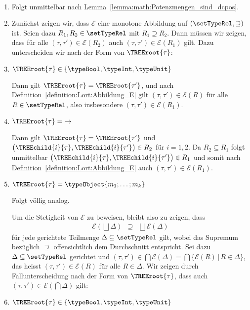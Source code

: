 \begin{beweis} \
  \begin{enumerate}
    \item Folgt unmittelbar nach Lemma~\ref{lemma:math:Potenzmengen_sind_dcpos}.

    \item Zun\"achst zeigen wir, dass $\mathcal{E}$ eine monotone Abbildung auf $(\setTypeRel,\supseteq)$ ist. Seien dazu
          $R_1,R_2\in\setTypeRel$ mit $R_1 \supseteq R_2$. Dann m\"ussen wir zeigen, dass f\"ur alle
          $(\tau,\tau')\in\mathcal{E}(R_2)$ auch $(\tau,\tau')\in\mathcal{E}(R_1)$ gilt. Dazu unterscheiden
          wir nach der Form von $\TREEroot{\tau}$:
          \PROOFCASEbeg
            \item $\TREEroot{\tau} \in \{\typeBool,\typeInt,\typeUnit\}$

                  Dann gilt $\TREEroot{\tau} = \TREEroot{\tau'}$, und nach Definition~\ref{definition:Lort:Abbildung_E}
                  gilt $(\tau,\tau')\in\mathcal{E}(R)$ f\"ur alle $R\in\setTypeRel$, also insbesondere
                  $(\tau,\tau')\in\mathcal{E}(R_1)$.
            
            \item $\TREEroot{\tau} =\ \to$

                  Dann gilt $\TREEroot{\tau} = \TREEroot{\tau'}$ und $\bigl(\TREEchild{i}{\tau},\TREEchild{i}{\tau'}\bigr)\in{R_2}$
                  f\"ur $i=1,2$. Da $R_2 \subseteq R_1$ folgt unmittelbar $\bigl(\TREEchild{i}{\tau},\TREEchild{i}{\tau'}\bigr)\in{R_1}$
                  und somit nach Definition~\ref{definition:Lort:Abbildung_E} auch $(\tau,\tau')\in\mathcal{E}(R_1)$.
            
            \item $\TREEroot{\tau} = \typeObject{m_1;\ldots;m_k}$

                  Folgt v\"ollig analog.
          \PROOFCASEend

          Um die Stetigkeit von $\mathcal{E}$ zu beweisen, bleibt also zu zeigen, dass
          \[\begin{array}{rcl}
            \mathcal{E}(\bigsqcup \Delta) & \supseteq & \bigsqcup \mathcal{E}(\Delta)
          \end{array}\]
          f\"ur jede gerichtete Teilmenge $\Delta\subseteq\setTypeRel$ gilt, wobei das
          Supremum bez\"uglich $\supseteq$ offensichtlich dem Durchschnitt entspricht.
          Sei dazu $\Delta\subseteq\setTypeRel$ gerichtet und
          $(\tau,\tau')\in\bigcap \mathcal{E}(\Delta) = \bigcap \{\mathcal{E}(R)\,|\,R\in\Delta\}$,
          das heisst $(\tau,\tau')\in\mathcal{E}(R)$ f\"ur alle $R\in\Delta$.
          Wir zeigen durch Fallunterscheidung nach der Form von $\TREEroot{\tau}$, dass auch
          $(\tau,\tau')\in\mathcal{E}(\bigcap \Delta)$ gilt:
          \PROOFCASEbeg
            \item $\TREEroot{\tau} \in \{\typeBool,\typeInt,\typeUnit\}$


\end{enumerate}
\end{beweis}
